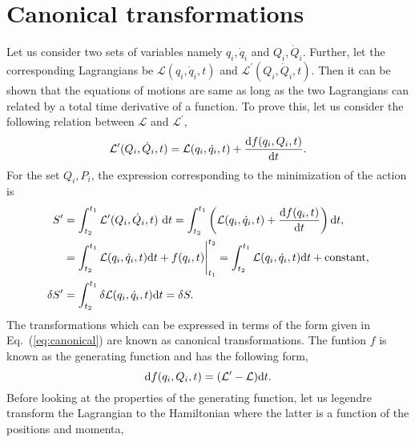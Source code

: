\documentclass[a4paper]{article}
\begin{document}
\section{Canonical transformations}
Let us consider two sets of variables namely $q_{i},\dot{q}_{i}$ and $Q_{i},\dot{Q}_{i}$. Further, let the corresponding Lagrangians be $\mathcal{L}(q_{i},\dot{q}_{i},t)$ and $\mathcal{L}^{\prime}(Q_{i},\dot{Q}_{i},t)$. Then it can be shown that the equations of motions are same as long as the two Lagrangians can related by a total time derivative of a function. To prove this, let us consider the following relation between $\mathcal{L}$ and $\mathcal{L}^{\prime}$,
\begin{equation}\label{eq:canonical}
\mathcal{L}^{\prime}(Q_{i},\dot{Q}_{i},t)=\mathcal{L}(q_{i},\dot{q}_{i},t) + \frac{{\rm d}f(q_{i},Q_{i},t)}{{\rm d}t}.
\end{equation}
For the set $Q_{i},P_{i}$, the expression corresponding to the minimization of the action is
\begin{equation}
\begin{split}
S^{\prime}&=\int^{t_{1}}_{t_{2}}\mathcal{L}^{\prime}(Q_{i},\dot{Q}_{i},t)~{\rm d}t=\int^{t_{1}}_{t_{2}}\left(\mathcal{L}(q_{i},\dot{q}_{i},t) + \frac{{\rm d}f(q_{i},t)}{{\rm d}t}\right){\rm d}t,
\\
&=\int^{t_{1}}_{t_{2}}\mathcal{L}(q_{i},\dot{q}_{i},t){\rm d}t + f(q_{i},t)\Bigg|_{t_{1}}^{t_{2}}=\int^{t_{1}}_{t_{2}}\mathcal{L}(q_{i},\dot{q}_{i},t){\rm d}t + {\rm constant},\\
\delta S^{\prime}&=\int^{t_{1}}_{t_{2}}\delta\mathcal{L}(q_{i},\dot{q}_{i},t){\rm d}t=\delta S.
\end{split}
\end{equation}
The transformations which can be expressed in terms of the form given in Eq.~(\ref{eq:canonical}) are known as canonical transformations. The funtion $f$ is known as the generating function and has the following form,
\begin{equation}
{\rm d}f(q_{i},Q_{i},t)=(\mathcal{L}^{\prime}-\mathcal{L}){\rm d}t.
\end{equation}
Before looking at the properties of the generating function, let us legendre transform the Lagrangian to the Hamiltonian where the latter is a function of the positions and momenta,
\end{document}
